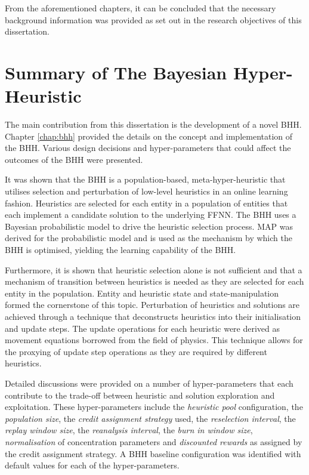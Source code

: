From the aforementioned chapters, it can be concluded that the necessary background information was provided as set out in the research objectives of this dissertation.


\section{Summary of The Bayesian Hyper-Heuristic}
\label{sec:conclusion:bhh}

The main contribution from this dissertation is the development of a novel \acf{BHH}. Chapter \ref{chap:bhh} provided the details on the concept and implementation of the \ac{BHH}. Various design decisions and hyper-parameters that could affect the outcomes of the \ac{BHH} were presented.

It was shown that the \acs{BHH} is a population-based, meta-hyper-heuristic that utilises selection and perturbation of low-level heuristics in an online learning fashion. Heuristics are selected for each entity in a population of entities that each implement a candidate solution to the underlying \acs{FFNN}. The \acs{BHH} uses a Bayesian probabilistic model to drive the heuristic selection process. \acs{MAP} was derived for the probabilistic model and is used as the mechanism by which the \acs{BHH} is optimised, yielding the learning capability of the \acs{BHH}.

Furthermore, it is shown that heuristic selection alone is not sufficient and that a mechanism of transition between heuristics is needed as they are selected for each entity in the population. Entity and heuristic state and state-manipulation formed the cornerstone of this topic. Perturbation of heuristics and solutions are achieved through a technique that deconstructs heuristics into their initialisation and update steps. The update operations for each heuristic were derived as movement equations borrowed from the field of physics. This technique allows for the proxying of update step operations as they are required by different heuristics.

Detailed discussions were provided on a number of hyper-parameters that each contribute to the trade-off between heuristic and solution exploration and exploitation. These hyper-parameters include the \textit{heuristic pool} configuration, the \textit{population size}, the \textit{credit assignment strategy} used, the \textit{reselection interval}, the \textit{replay window size}, the \textit{reanalysis interval}, the \textit{burn in window size}, \textit{normalisation} of concentration parameters and \textit{discounted rewards} as assigned by the credit assignment strategy. A \acs{BHH} baseline configuration was identified with default values for each of the hyper-parameters.

